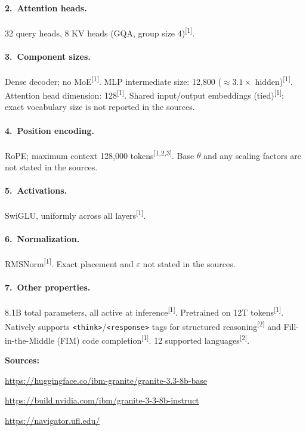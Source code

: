 \documentclass[11pt, a4paper]{article}
\newcommand{\src}[1]{\textsuperscript{\normalfont\small[#1]}}
\begin{document}
\paragraph{2.~Attention heads.}
32 query heads, 8 KV heads (GQA, group size 4)\src{1}.

\paragraph{3.~Component sizes.}
Dense decoder; no MoE\src{1}.
MLP intermediate size: 12,800 ($\approx3.1\times$ hidden)\src{1}.
Attention head dimension: 128\src{1}.
Shared input/output embeddings (tied)\src{1};
exact vocabulary size is not reported in the sources.

\paragraph{4.~Position encoding.}
RoPE; maximum context 128,000 tokens\src{1,2,3}.
Base $\theta$ and any scaling factors are not stated in the sources.

\paragraph{5.~Activations.}
SwiGLU, uniformly across all layers\src{1}.

\paragraph{6.~Normalization.}
RMSNorm\src{1}.
Exact placement and $\varepsilon$ not stated in the sources.

\paragraph{7.~Other properties.}
8.1B total parameters, all active at inference\src{1}.
Pretrained on 12T tokens\src{1}.
Natively supports \texttt{<think>}/\texttt{<response>} tags for structured
reasoning\src{2} and Fill-in-the-Middle (FIM) code completion\src{1}.
12 supported languages\src{2}.

\noindent\textbf{Sources:}
\begin{enumerate}[noitemsep,label=\small{[\arabic*]},leftmargin=*,topsep=2pt]
\item \small\url{https://huggingface.co/ibm-granite/granite-3.3-8b-base}
\item \small\url{https://build.nvidia.com/ibm/granite-3-3-8b-instruct}
\item \small\url{https://navigator.ufl.edu/}
\end{enumerate}
\end{document}
